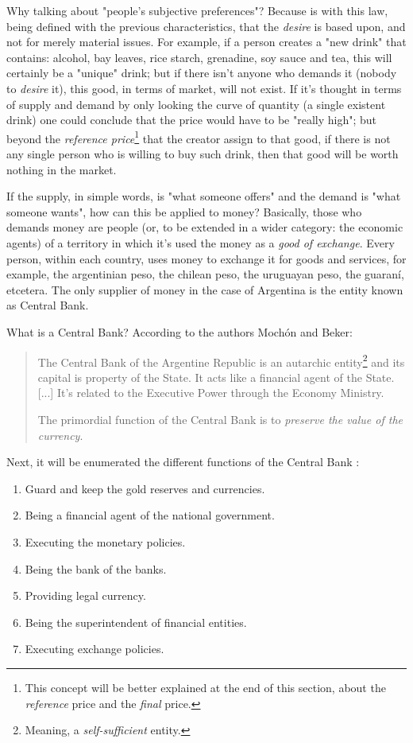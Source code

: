 \documentclass[12pt,a4paper,twoside]{book}
\begin{document}
Why talking about "people's subjective preferences"? Because is with this law, being defined with the previous characteristics, that the \textit{desire} is based upon, and not for merely material issues. For example, if a person creates a "new drink" that contains: alcohol, bay leaves, rice starch, grenadine, soy sauce and tea, this will certainly be a "unique" drink; but if there isn't anyone who demands it (nobody to \textit{desire} it), this good, in terms of market, will not exist. If it's thought in terms of supply and demand by only looking the curve of quantity (a single existent drink) one could conclude that the price would have to be "really high"; but beyond the \textit{reference price}\footnote{This concept will be better explained at the end of this section, about the \textit{reference} price and the \textit{final} price.} that the creator assign to that good, if there is not any single person who is willing to buy such drink, then that good will be worth nothing in the market.

If the supply, in simple words, is "what someone offers" and the demand is "what someone wants", how can this be applied to money? Basically, those who demands money are people (or, to be extended in a wider category: the economic agents) of a territory in which it's used the money as a \textit{good of exchange}. Every person, within each country, uses money to exchange it for goods and services, for example, the argentinian peso, the chilean peso, the uruguayan peso, the guaraní, etcetera. The only supplier of money in the case of Argentina is the entity known as Central Bank.

What is a Central Bank? According to the authors Mochón and Beker:

\begin{quotation}
The Central Bank of the Argentine Republic is an autarchic entity\footnote{Meaning, a \textit{self-sufficient} entity.} and its capital is property of the State. It acts like a financial agent of the State. [...] It's related to the Executive Power through the Economy Ministry.

The primordial function of the Central Bank is to \textit{preserve the value of the currency}. \cite[p. 288]{mochobeker}
\end{quotation}

Next, it will be enumerated the different functions of the Central Bank \cite[pp. 288-289]{mochobeker}:

\begin{enumerate}
\item Guard and keep the gold reserves and currencies.
\item Being a financial agent of the national government.
\item Executing the monetary policies.
\item Being the bank of the banks.
\item Providing legal currency.
\item Being the superintendent of financial entities.
\item Executing exchange policies.
\end{enumerate}
\end{document}
